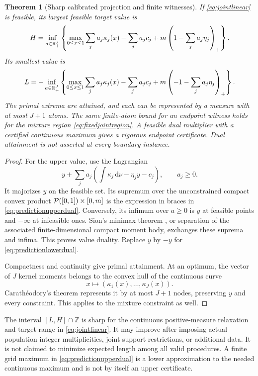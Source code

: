 \documentclass[11pt]{article}
\numberwithin{equation}{section}
\newtheorem{theorem}{Theorem}[section]
\theoremstyle{definition}
\theoremstyle{remark}
\newcommand{\dd}{\,\mathrm d}\newcommand{\norm}[1]{\left\lVert#1\right\rVert}\newcommand{\Scal}{\mathsf S}\newcommand{\Tcal}{\mathsf T}
\begin{document}
\begin{theorem}[Sharp calibrated projection and finite witnesses]\label{thm:predictiondual}
If \eqref{eq:jointlinear} is feasible, its largest feasible target value is
\begin{equation}\label{eq:predictionupperdual}
 H=\inf_{a\in\mathbb R_+^J}\left\{
 \max_{0\le x\le1}\sum_ja_j\kappa_j(x)
 -\sum_ja_jc_j
 +m\left(1-\sum_ja_j\eta_j\right)_+\right\}.
\end{equation}
Its smallest value is
\begin{equation}\label{eq:predictionlowerdual}
 L=-\inf_{a\in\mathbb R_+^J}\left\{
 \max_{0\le x\le1}\sum_ja_j\kappa_j(x)
 -\sum_ja_jc_j
 +m\left(-1-\sum_ja_j\eta_j\right)_+\right\}.
\end{equation}
The primal extrema are attained, and each can be represented by a measure with at most $J+1$ atoms. The same finite-atom bound for an endpoint witness holds for the mixture region \eqref{eq:fixedjointregion}. A feasible dual multiplier with a certified continuous maximum gives a rigorous endpoint certificate. Dual attainment is not asserted at every boundary instance.
\end{theorem}
\begin{proof}
For the upper value, use the Lagrangian
\[
 y+\sum_ja_j\left(\int\kappa_j\dd\nu-\eta_jy-c_j\right),\qquad a_j\ge0.
\]
It majorizes $y$ on the feasible set. Its supremum over the unconstrained compact convex product $\mathcal P([0,1])\times[0,m]$ is the expression in braces in \eqref{eq:predictionupperdual}. Conversely, its infimum over $a\ge0$ is $y$ at feasible points and $-\infty$ at infeasible ones. Sion's minimax theorem \cite{Sion1958}, or separation of the associated finite-dimensional compact moment body, exchanges these suprema and infima. This proves value duality. Replace $y$ by $-y$ for \eqref{eq:predictionlowerdual}.

Compactness and continuity give primal attainment. At an optimum, the vector of $J$ kernel moments belongs to the convex hull of the continuous curve
\[
 x\longmapsto(\kappa_1(x),\ldots,\kappa_J(x)).
\] Carath\'eodory's theorem represents it by at most $J+1$ nodes, preserving $y$ and every constraint. This applies to the mixture constraint as well.
\end{proof}
The interval $[L,H]\cap\mathbb Z$ is sharp for the continuous positive-measure relaxation and target range in \eqref{eq:jointlinear}. It may improve after imposing actual-population integer multiplicities, joint support restrictions, or additional data. It is not claimed to minimize expected length among all valid procedures. A finite grid maximum in \eqref{eq:predictionupperdual} is a lower approximation to the needed continuous maximum and is not by itself an upper certificate.
\end{document}
